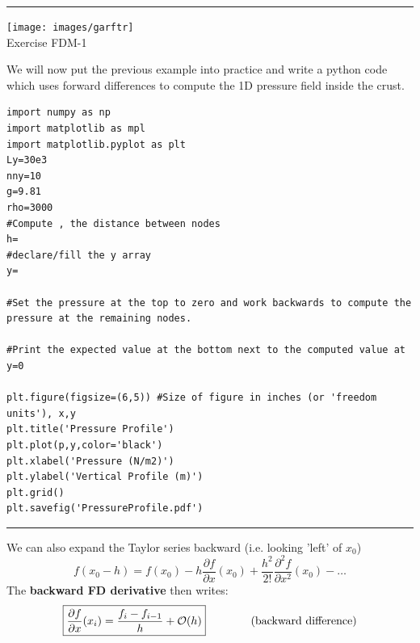 \begin{center}
\begin{minipage}[t]{0.77\textwidth}
\par\noindent\rule{\textwidth}{0.4pt}

\begin{center}
\texttt{[image: images/garftr]} \\
{\color{orange}Exercise FDM-1}
\end{center}

We will now put the previous example into practice and write a 
python code which uses forward differences to compute the 1D pressure
field inside the crust.

\begin{verbatim}
import numpy as np
import matplotlib as mpl 
import matplotlib.pyplot as plt 
Ly=30e3
nny=10
g=9.81
rho=3000
#Compute , the distance between nodes
h=
#declare/fill the y array 
y=

#Set the pressure at the top to zero and work backwards to compute the pressure at the remaining nodes.

#Print the expected value at the bottom next to the computed value at y=0

plt.figure(figsize=(6,5)) #Size of figure in inches (or 'freedom units'), x,y
plt.title('Pressure Profile')
plt.plot(p,y,color='black')
plt.xlabel('Pressure (N/m2)')
plt.ylabel('Vertical Profile (m)')
plt.grid()
plt.savefig('PressureProfile.pdf')
\end{verbatim}

\par\noindent\rule{\textwidth}{0.4pt}
\end{minipage}
\end{center}


\newpage

\noindent We can also expand the Taylor series backward (i.e. looking 'left' of $x_0$)
\begin{equation}
f(x_0-h)=f(x_0)-
h \frac{\partial f}{\partial x}(x_0)  + 
\frac{h^2}{2!} \frac{\partial^2 f}{\partial x^2}(x_0)  -
\dots 
\end{equation}
The {\bf backward FD derivative} then writes:
\begin{equation}
\boxed{
\frac{\partial f}{\partial x}(x_i) = \frac{f_{i}-f_{i-1}}{h} + {\cal O}(h) 
}
\qquad
\qquad
\text{(backward difference)} 
\end{equation}




